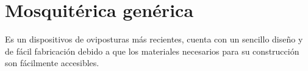 \section{Mosquitérica genérica}
Es un dispositivos de oviposturas más recientes, cuenta con un sencillo
diseño y de fácil fabricación debido a que los materiales necesarios para
su construcción son fácilmente accesibles.
